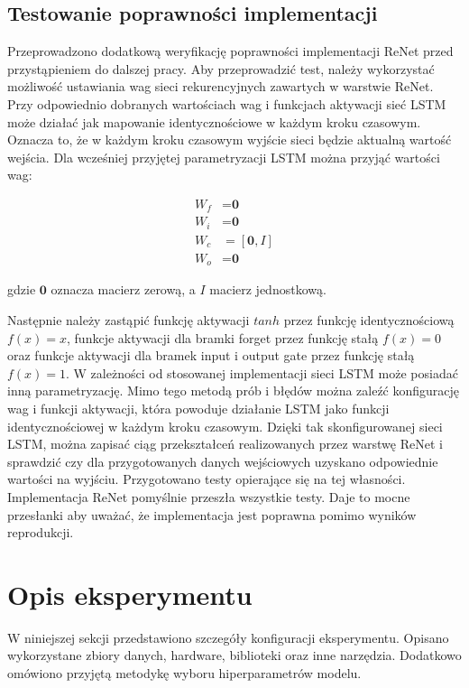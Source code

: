 \documentclass[oneside, mag]{mgr}
\newcommand{\bb}{\textbf}
\begin{document}
\subsection{Testowanie poprawności implementacji}

Przeprowadzono dodatkową weryfikację poprawności implementacji ReNet przed przystąpieniem do dalszej pracy. Aby przeprowadzić test, należy wykorzystać możliwość ustawiania wag sieci rekurencyjnych zawartych w warstwie ReNet. Przy odpowiednio dobranych wartościach wag i funkcjach aktywacji sieć LSTM może działać jak mapowanie identycznościowe w każdym kroku czasowym. Oznacza to, że w każdym kroku czasowym wyjście sieci  będzie aktualną wartość wejścia. Dla wcześniej przyjętej parametryzacji LSTM można przyjąć wartości wag:

\begin{align*}
	W_f &= \bb{0} \\
	W_i &= \bb{0} \\
	W_c &= [\bb{0},I] \\
	W_o &= \bb{0}
\end{align*}

gdzie $\bb{0}$ oznacza macierz zerową, a $I$ macierz jednostkową.

Następnie należy zastąpić funkcję aktywacji $tanh$ przez funkcję identycznościową $f(x) = x$, funkcje aktywacji dla bramki forget przez funkcję stałą $f(x) = 0$ oraz funkcje aktywacji dla bramek input i output gate przez funkcję stałą $f(x) = 1$. W zależności od stosowanej implementacji sieci LSTM może posiadać inną parametryzację. Mimo tego metodą prób i błędów można zaleźć konfigurację wag i funkcji aktywacji, która powoduje działanie LSTM jako funkcji identycznościowej w każdym kroku czasowym. Dzięki tak skonfigurowanej sieci LSTM, można zapisać ciąg przekształceń realizowanych przez warstwę ReNet i sprawdzić czy dla przygotowanych danych wejściowych uzyskano odpowiednie wartości na wyjściu. Przygotowano testy opierające się na tej własności. Implementacja ReNet pomyślnie przeszła wszystkie  testy. Daje to mocne przesłanki aby uważać, że implementacja jest poprawna pomimo wyników reprodukcji.

\section{Opis eksperymentu}

W niniejszej sekcji przedstawiono szczegóły konfiguracji eksperymentu. Opisano wykorzystane zbiory danych, hardware, biblioteki oraz inne narzędzia. Dodatkowo omówiono przyjętą metodykę wyboru hiperparametrów modelu.
\end{document}
